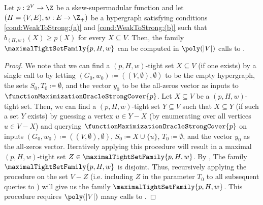  \begin{lemma}\label{lem:WeakToStrong::maximal-tight-set-family-computed-in-strongly-polytime}
 Let $p:2^V\rightarrow\Z$ be a skew-supermodular function and let $\left(H = (V, E), w:E \rightarrow\Z_+\right)$ be a hypergraph satisfying conditions \ref{cond:WeakToStrong:(a)} and \ref{cond:WeakToStrong:(b)} such that $b_{(H,w)}(X) \geq p(X)$ for every $X \subseteq V$. Then, the family $\maximalTightSetFamily{p, H, w}$ can be computed in $\poly(|V|)$ calls to .
\end{lemma}
\begin{proof}
    We note that we can find a $(p, H, w)$-tight set $X\subseteq V$ 
    (if one exists) by a single call to  by letting  $(G_0, w_0) \coloneqq  \left((V, \emptyset), \emptyset\right)$ to be the empty hypergraph, the sets $S_0, T_0 \coloneqq  \emptyset$, and the vector $y_0$ to be the all-zeros vector as inputs to $\functionMaximizationOracleStrongCover{{p}}$. 
    Let $X \subseteq V$ be a $(p, H, w)$-tight set. Then, we can find a $(p, H, w)$-tight set $Y \subseteq V$ such that $X \subseteq Y$ (if such a set $Y$ exists) by guessing a vertex $u \in Y - X$ (by enumerating over all vertices $u \in V - X$) and querying $\functionMaximizationOracleStrongCover{p}$ on inputs  $(G_0, w_0) \coloneqq  \left((V, \emptyset), \emptyset\right)$, $S_0 \coloneqq  X \cup \{u\}$, $T_0 \coloneqq  \emptyset$, and the vector $y_0$ as the all-zeros vector. Iteratively applying this procedure will result in a maximal $(p, H, w)$-tight set $Z \in \maximalTightSetFamily{p, H, w}$. By , The family $\maximalTightSetFamily{p, H, w}$ is disjoint. Thus, recursively applying the procedure on the set $V - Z$ (i.e. including $Z$ in the parameter $T_0$ to all subsequent queries to ) will give us the family $\maximalTightSetFamily{p, H, w}$. This procedure requires  $\poly(|V|)$ many calls to .
    \end{proof}


